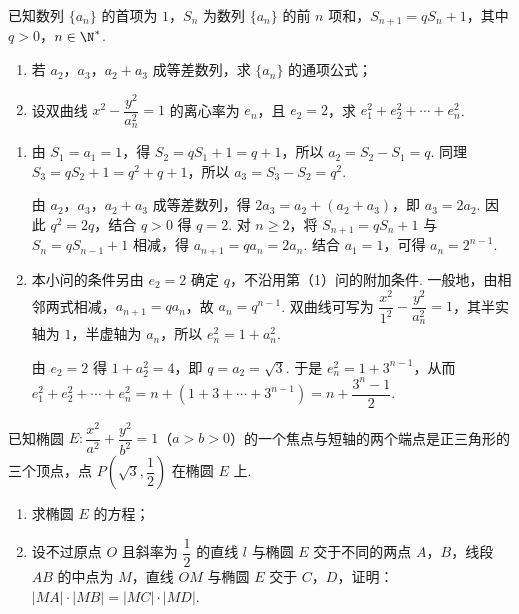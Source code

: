 \begin{problem}
已知数列 \(\{a_n\}\) 的首项为 \(1\)，\(S_n\) 为数列 \(\{a_n\}\) 的前 \(n\) 项和，\(S_{n+1}=qS_n+1\)，其中 \(q>0\)，\(n\in\N^*\).

\begin{enumerate}
\item 若 \(a_2\)，\(a_3\)，\(a_2+a_3\) 成等差数列，求 \(\{a_n\}\) 的通项公式；
\item 设双曲线 \(x^2-\dfrac{y^2}{a_n^2}=1\) 的离心率为 \(e_n\)，且 \(e_2=2\)，求 \(e_1^2+e_2^2+\cdots+e_n^2\).
\end{enumerate}
\end{problem}

\begin{solution}
\begin{enumerate}
\item 由 \(S_1=a_1=1\)，得 \(S_2=qS_1+1=q+1\)，所以 \(a_2=S_2-S_1=q\). 同理 \(S_3=qS_2+1=q^2+q+1\)，所以 \(a_3=S_3-S_2=q^2\).

由 \(a_2\)，\(a_3\)，\(a_2+a_3\) 成等差数列，得 \(2a_3=a_2+(a_2+a_3)\)，即 \(a_3=2a_2\). 因此 \(q^2=2q\)，结合 \(q>0\) 得 \(q=2\). 对 \(n\geqslant2\)，将 \(S_{n+1}=qS_n+1\) 与 \(S_n=qS_{n-1}+1\) 相减，得 \(a_{n+1}=qa_n=2a_n\). 结合 \(a_1=1\)，可得 \(a_n=2^{n-1}\).
\item 本小问的条件另由 \(e_2=2\) 确定 \(q\)，不沿用第（1）问的附加条件. 一般地，由相邻两式相减，\(a_{n+1}=qa_n\)，故 \(a_n=q^{n-1}\). 双曲线可写为 \(\dfrac{x^2}{1^2}-\dfrac{y^2}{a_n^2}=1\)，其半实轴为 \(1\)，半虚轴为 \(a_n\)，所以 \(e_n^2=1+a_n^2\).

由 \(e_2=2\) 得 \(1+a_2^2=4\)，即 \(q=a_2=\sqrt3\). 于是 \(e_n^2=1+3^{n-1}\)，从而 \(e_1^2+e_2^2+\cdots+e_n^2=n+\left(1+3+\cdots+3^{n-1}\right)=n+\dfrac{3^n-1}{2}\).
\end{enumerate}
\end{solution}

\begin{problem}
已知椭圆 \(E:\dfrac{x^2}{a^2}+\dfrac{y^2}{b^2}=1\)（\(a>b>0\)）的一个焦点与短轴的两个端点是正三角形的三个顶点，点 \(P\!\left(\sqrt3,\dfrac12\right)\) 在椭圆 \(E\) 上.

\begin{enumerate}
\item 求椭圆 \(E\) 的方程；
\item 设不过原点 \(O\) 且斜率为 \(\dfrac12\) 的直线 \(l\) 与椭圆 \(E\) 交于不同的两点 \(A\)，\(B\)，线段 \(AB\) 的中点为 \(M\)，直线 \(OM\) 与椭圆 \(E\) 交于 \(C\)，\(D\)，证明：\(|MA|\cdot|MB|=|MC|\cdot|MD|\).
\end{enumerate}
\end{problem}

